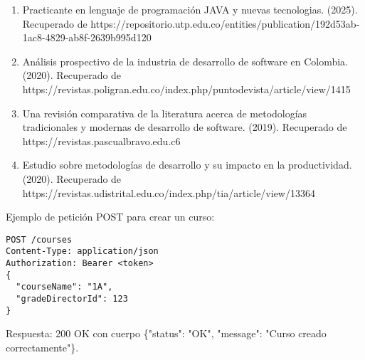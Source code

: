 \documentclass[sigconf,nonacm]{acmart}
\begin{document}
\begin{enumerate}
\item Practicante en lenguaje de programación JAVA y nuevas tecnologias. (2025). Recuperado de https://repositorio.utp.edu.co/entities/publication/192d53ab-1ac8-4829-ab8f-2639b995d120
\item Análisis prospectivo de la industria de desarrollo de software en Colombia. (2020). Recuperado de https://revistas.poligran.edu.co/index.php/puntodevista/article/view/1415
\item Una revisión comparativa de la literatura acerca de metodologías tradicionales y modernas de desarrollo de software. (2019). Recuperado de https://revistas.pascualbravo.edu.c6
\item Estudio sobre metodologías de desarrollo y su impacto en la productividad. (2020). Recuperado de https://revistas.udistrital.edu.co/index.php/tia/article/view/13364
\end{enumerate}

Ejemplo de petición POST para crear un curso:
\begin{verbatim}
POST /courses
Content-Type: application/json
Authorization: Bearer <token>
{
  "courseName": "1A",
  "gradeDirectorId": 123
}
\end{verbatim}
Respuesta: 200 OK con cuerpo \{"status": "OK", "message": "Curso creado correctamente"\}.


\end{document}
